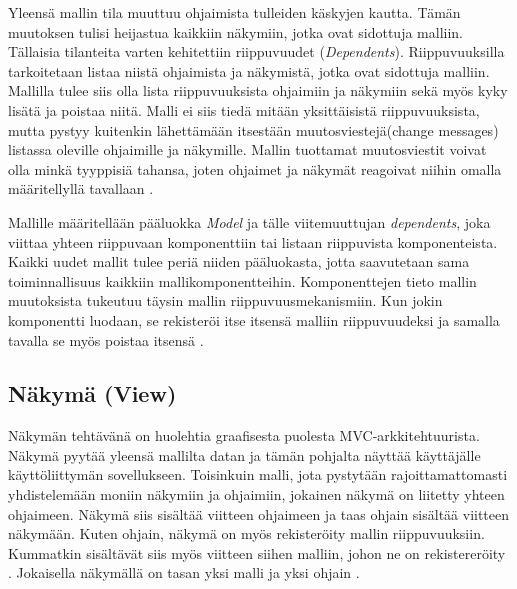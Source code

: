 \documentclass[finnish,utf8,nonumbib,palatino,kandi]{gradu2}
\begin{document}
Yleensä mallin tila muuttuu ohjaimista tulleiden käskyjen kautta. Tämän muutoksen tulisi heijastua kaikkiin näkymiin, jotka ovat sidottuja malliin. Tällaisia tilanteita varten kehitettiin riippuvuudet (\emph{Dependents}).
Riippuvuuksilla tarkoitetaan listaa niistä ohjaimista ja näkymistä, jotka ovat sidottuja malliin. Mallilla tulee siis olla lista riippuvuuksista ohjaimiin ja näkymiin sekä myös kyky lisätä ja poistaa niitä. Malli ei siis tiedä mitään yksittäisistä riippuvuuksista, mutta pystyy kuitenkin lähettämään itsestään muutosviestejä(change messages) listassa oleville ohjaimille ja näkymille. Mallin tuottamat muutosviestit voivat olla minkä tyyppisiä tahansa, joten ohjaimet ja näkymät reagoivat niihin omalla määritellyllä tavallaan  \cite[s.2-3]{Krasner}.

Mallille määritellään pääluokka \emph{Model} ja tälle viitemuuttujan \emph{dependents}, joka viittaa yhteen riippuvaan komponenttiin tai listaan riippuvista komponenteista. Kaikki uudet mallit tulee periä niiden pääluokasta, jotta saavutetaan sama toiminnallisuus kaikkiin mallikomponentteihin. Komponenttejen tieto mallin muutoksista tukeutuu täysin mallin riippuvuusmekanismiin. Kun jokin komponentti luodaan, se rekisteröi itse itsensä malliin riippuvuudeksi ja samalla tavalla se myös poistaa itsensä \cite{Burbeck}.

\subsection{Näkymä (View)}
Näkymän tehtävänä on huolehtia graafisesta puolesta MVC-arkkitehtuurista. Näkymä pyytää yleensä mallilta datan ja tämän pohjalta näyttää käyttäjälle käyttöliittymän sovellukseen. Toisinkuin malli, jota pystytään rajoittamattomasti yhdistelemään moniin näkymiin ja ohjaimiin, jokainen näkymä on liitetty yhteen ohjaimeen.  Näkymä siis sisältää viitteen ohjaimeen ja taas ohjain sisältää viitteen näkymään. Kuten ohjain, näkymä on myös rekisteröity mallin riippuvuuksiin. Kummatkin sisältävät siis myös viitteen siihen malliin, johon ne on rekistereröity \cite{Burbeck}. Jokaisella näkymällä on tasan yksi malli ja yksi ohjain \cite[s. 7]{Krasner:desc}.
\end{document}
